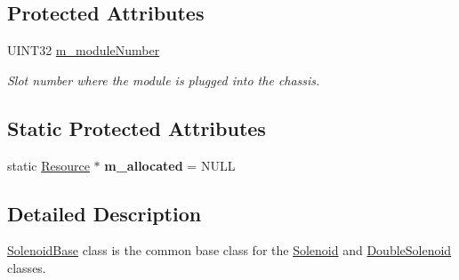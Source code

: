 \subsection*{Protected Attributes}
\begin{DoxyCompactItemize}
\item 
\hypertarget{classSolenoidBase_a0687ad7201f53c533a21eacdd1d6cf42}{
UINT32 \hyperlink{classSolenoidBase_a0687ad7201f53c533a21eacdd1d6cf42}{m\_\-moduleNumber}}
\label{classSolenoidBase_a0687ad7201f53c533a21eacdd1d6cf42}

\begin{DoxyCompactList}\small\item\em Slot number where the module is plugged into the chassis. \end{DoxyCompactList}\end{DoxyCompactItemize}
\subsection*{Static Protected Attributes}
\begin{DoxyCompactItemize}
\item 
\hypertarget{classSolenoidBase_aea1b158d126f24e89dc145871511e35c}{
static \hyperlink{classResource}{Resource} $\ast$ {\bfseries m\_\-allocated} = NULL}
\label{classSolenoidBase_aea1b158d126f24e89dc145871511e35c}

\end{DoxyCompactItemize}


\subsection{Detailed Description}
\hyperlink{classSolenoidBase}{SolenoidBase} class is the common base class for the \hyperlink{classSolenoid}{Solenoid} and \hyperlink{classDoubleSolenoid}{DoubleSolenoid} classes. 

